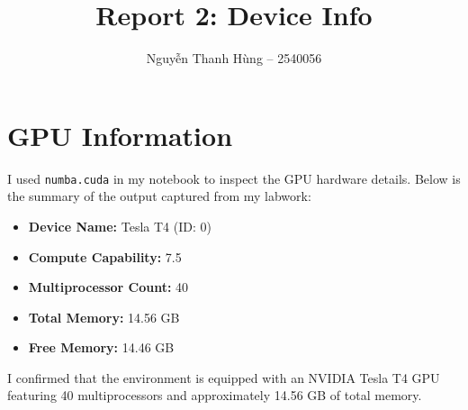 \documentclass{article}
\title{Report 2: Device Info}
\author{Nguyễn Thanh Hùng -- 2540056}
\date{}
\begin{document}
\maketitle

\section{GPU Information}
I used \texttt{numba.cuda} in my notebook to inspect the GPU hardware details. Below is the summary of the output captured from my labwork:

\begin{itemize}
    \item \textbf{Device Name:} Tesla T4 (ID: 0)
    \item \textbf{Compute Capability:} 7.5
    \item \textbf{Multiprocessor Count:} 40
    \item \textbf{Total Memory:} 14.56 GB
    \item \textbf{Free Memory:} 14.46 GB
\end{itemize}

I confirmed that the environment is equipped with an NVIDIA Tesla T4 GPU featuring 40 multiprocessors and approximately 14.56 GB of total memory.
\end{document}
